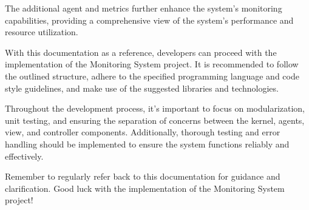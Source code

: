 \documentclass[12pt, a4paper]{article}
\begin{document}
The additional agent and metrics further enhance the system's monitoring capabilities, providing a comprehensive view of the system's performance and resource utilization.

With this documentation as a reference, developers can proceed with the implementation of the Monitoring System project. It is recommended to follow the outlined structure, adhere to the specified programming language and code style guidelines, and make use of the suggested libraries and technologies.

Throughout the development process, it's important to focus on modularization, unit testing, and ensuring the separation of concerns between the kernel, agents, view, and controller components. Additionally, thorough testing and error handling should be implemented to ensure the system functions reliably and effectively.

Remember to regularly refer back to this documentation for guidance and clarification. Good luck with the implementation of the Monitoring System project!
\end{document}
